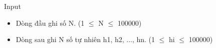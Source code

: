 Input  
\begin{itemize}
	\item     Dòng đầu ghi số N. (1  $\le$  N  $\le$  100000)   
\end{itemize}
\begin{itemize}
	\item     Dòng sau ghi N số tự nhiên h1, h2, ..., hn. (1  $\le$  hi  $\le$  100000)   
\end{itemize}
